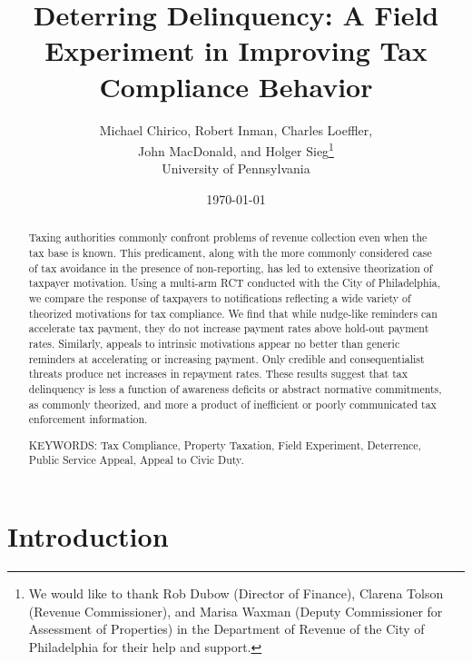 \documentclass[12pt,titlepage]{article}
\begin{document}
\title{Deterring Delinquency: A Field Experiment in Improving Tax Compliance Behavior}

\author{Michael Chirico, Robert Inman, Charles Loeffler, \\
        John MacDonald, and Holger Sieg\thanks{We would like to
        thank Rob Dubow (Director of Finance), Clarena Tolson (Revenue
        Commissioner), and Marisa Waxman (Deputy Commissioner for
        Assessment of Properties) in the Department of Revenue of the City
        of Philadelphia for their help and support.}  \\
        University of Pennsylvania}

\date{\today}

\maketitle

\begin{abstract}

Taxing authorities commonly confront problems of revenue collection
even when the tax base is known. This predicament, along with the more
commonly considered case of tax avoidance in the presence of non-reporting,
has led to extensive theorization of taxpayer motivation. Using a multi-arm
RCT conducted with the City of Philadelphia, we compare the response of
taxpayers to notifications reflecting a wide variety of theorized motivations
for tax compliance. We find that while nudge-like reminders can accelerate
tax payment, they do not increase payment rates above hold-out payment rates.
Similarly, appeals to intrinsic motivations appear no better than generic
reminders at accelerating or increasing payment. Only credible and
consequentialist threats produce net increases in repayment rates. These
results suggest that tax delinquency is less a function of awareness
deficits or abstract normative commitments, as commonly theorized, and
more a product of inefficient or poorly communicated tax enforcement information.

\noindent KEYWORDS: Tax Compliance, Property Taxation, Field
Experiment, Deterrence, Public Service Appeal, Appeal to Civic Duty.

\end{abstract}

\newpage

\section{Introduction}
\end{document}
